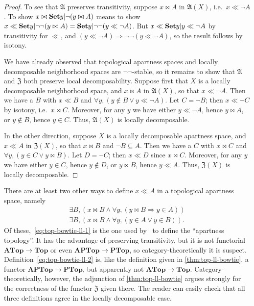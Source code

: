 \documentclass{article}
\def\cpl#1{\neg #1}
\let\implies\Rightarrow
\def\anti{\mathfrak{A}}
\def\neigh{\mathfrak{Z}}
\def\nn{\ensuremath{\neg\neg}}
\def\PTop{\mathbf{PTop}}
\def\Top{\mathbf{Top}}
\def\APTop{\mathbf{APTop}}
\def\ATop{\mathbf{ATop}}
\begin{document}
\begin{proof}
  To see that $\anti$ preserves transitivity, suppose $x\bowtie A$ in $\anti(X)$, i.e.\ $x\ll \cpl{A}$.
  To show $x\bowtie \setof{y|\neg(y\bowtie A)}$ means to show $x\ll \setof{y|\neg\neg(y\bowtie A)} = \setof{y|\neg\neg(y\ll \cpl{A})}$.
  But $x\ll \setof{y|y\ll \cpl{A}}$ by transitivity for $\ll$, and $(y\ll \cpl{A})\implies\neg\neg(y\ll\cpl{A})$, so the result follows by isotony.

  We have already observed that topological apartness spaces and locally decomposable neighborhood spaces are \nn-stable, so it remains to show that $\anti$ and $\neigh$ both preserve local decomposability.
  Suppose first that $X$ is a locally decomposable neighborhood space, and $x \bowtie A$ in $\anti(X)$, so that $x\ll \cpl{A}$.
  Then we have a $B$ with $x\ll B$ and $\forall y, (y\notin B \lor y\ll \cpl{A})$.
  Let $C = \cpl{B}$; then $x\ll \cpl{C}$ by isotony, i.e.\ $x\bowtie C$.
  Moreover, for any $y$ we have either $y\ll\cpl{A}$, hence $y\bowtie A$, or $y\notin B$, hence $y\in C$.
  Thus, $\anti(X)$ is locally decomposable.

  In the other direction, suppose $X$ is a locally decomposable apartness space, and $x\ll A$ in $\neigh(X)$, so that $x\bowtie B$ and $\cpl{B}\subseteq A$.
  Then we have a $C$ with $x\bowtie C$ and $\forall y, (y\in C \lor y\bowtie B)$.
  Let $D = \cpl{C}$; then $x\ll D$ since $x\bowtie C$.
  Moreover, for any $y$ we have either $y\in C$, hence $y\notin D$, or $y\bowtie B$, hence $y\ll A$.
  Thus, $\neigh(X)$ is locally decomposable.
\end{proof}

\begin{rmk}
  There are at least two other ways to define $x\ll A$ in a topological apartness space, namely
  \begin{gather}
    \exists B, (x\bowtie B \land \forall y, (y\bowtie B \implies y\in A))\label{eq:top-bowtie-ll-1}\\
    \exists B, (x\bowtie B \land \forall y, (y\in A \lor y\in B)).\label{eq:top-bowtie-ll-2}
  \end{gather}
  Of these,~\eqref{eq:top-bowtie-ll-1} is the one used by~\cite{bridges} to define the ``apartness topology''.
  It has the advantage of preserving transitivity, but it is not functorial $\ATop \to \Top$ or even $\APTop \to \PTop$, so category-theoretically it is suspect.
  Definition~\eqref{eq:top-bowtie-ll-2} is, like the definition given in \cref{thm:top-ll-bowtie}, a functor $\APTop \to \PTop$, but apparently not $\ATop \to \Top$.
  Category-theoretically, however, the adjunction of \cref{thm:top-ll-bowtie} argues strongly for the correctness of the functor $\neigh$ given there.
  The reader can easily check that all three definitions agree in the locally decomposable case.
\end{rmk}
\end{document}
